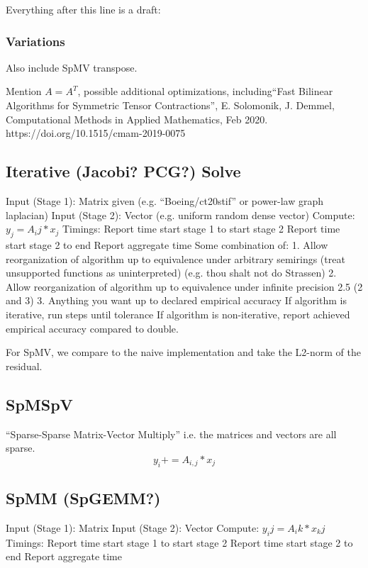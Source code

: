 \documentclass{article}
\begin{document}
Everything after this line is a draft:



\subsubsection{Variations}
    Also include SpMV transpose.

    Mention $A=A^T$, possible additional optimizations,
    including``Fast Bilinear Algorithms for Symmetric Tensor 
    Contractions'', E. Solomonik, J. Demmel, Computational Methods
    in Applied Mathematics, Feb 2020.
    \newline
    https://doi.org/10.1515/cmam-2019-0075



\subsection{Iterative (Jacobi? PCG?) Solve}
	Input (Stage 1):
		Matrix given (e.g. “Boeing/ct20stif” or power-law graph laplacian)
	Input (Stage 2):
		Vector (e.g. uniform random dense vector)
	Compute:
		$y_j = A_ij * x_j$
	Timings:
Report time start stage 1 to start stage 2
Report time start stage 2 to end
Report aggregate time
Some combination of:
1. Allow reorganization of algorithm up to equivalence under arbitrary semirings (treat unsupported functions as uninterpreted) (e.g. thou shalt not do Strassen)
2. Allow reorganization of algorithm up to equivalence under infinite precision
2.5 (2 and 3)
3. Anything you want up to declared empirical accuracy
If algorithm is iterative, run steps until tolerance
If algorithm is non-iterative, report achieved empirical accuracy compared to double.

For SpMV, we compare to the naive implementation and take the L2-norm of the residual. 




\subsection{SpMSpV}
``Sparse-Sparse Matrix-Vector Multiply'' i.e. the matrices and vectors are all sparse.
$$y_i += A_{i,j} * x_j$$

\subsection{SpMM (SpGEMM?)}
	Input (Stage 1):
		Matrix
	Input (Stage 2):
		Vector
	Compute:
		$y_ij = A_ik * x_kj$
	Timings:
Report time start stage 1 to start stage 2
Report time start stage 2 to end
Report aggregate time
\end{document}
